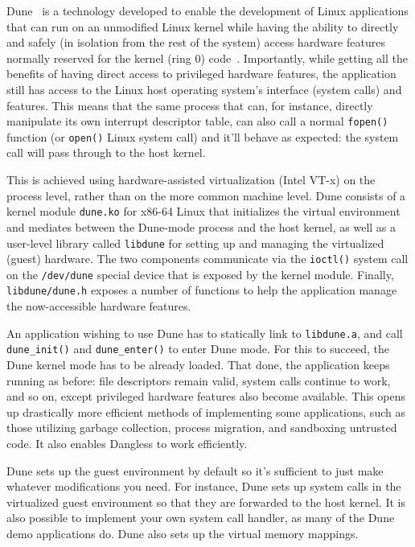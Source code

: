 Dune~\cite{dune-website} is a technology developed to enable the development of Linux applications that can run on an unmodified Linux kernel while having the ability to directly and safely (in isolation from the rest of the system) access hardware features normally reserved for the kernel (ring 0) code~\cite{dune-paper}. Importantly, while getting all the benefits of having direct access to privileged hardware features, the application still has access to the Linux host operating system's interface (system calls) and features. This means that the same process that can, for instance, directly manipulate its own interrupt descriptor table, can also call a normal \lstinline!fopen()! function (or \lstinline!open()! Linux system call) and it'll behave as expected: the system call will pass through to the host kernel.

This is achieved using hardware-assisted virtualization (Intel VT-x) on the process level, rather than on the more common machine level. Dune consists of a kernel module \texttt{dune.ko} for x86-64 Linux that initializes the virtual environment and mediates between the Dune-mode process and the host kernel, as well as a user-level library called \texttt{libdune} for setting up and managing the virtualized (guest) hardware. The two components communicate via the \lstinline!ioctl()! system call on the \texttt{/dev/dune} special device that is exposed by the kernel module. Finally, \texttt{libdune/dune.h} exposes a number of functions to help the application manage the now-accessible hardware features.

An application wishing to use Dune has to statically link to \texttt{libdune.a}, and call \lstinline!dune_init()! and \lstinline!dune_enter()! to enter Dune mode. For this to succeed, the Dune kernel mode has to be already loaded. That done, the application keeps running as before: file descriptors remain valid, system calls continue to work, and so on, except privileged hardware features also become available. This opens up drastically more efficient methods of implementing some applications, such as those utilizing garbage collection, process migration, and sandboxing untrusted code. It also enables Dangless to work efficiently.

Dune sets up the guest environment by default so it's sufficient to just make whatever modifications you need. For instance, Dune sets up system calls in the virtualized guest environment so that they are forwarded to the host kernel. It is also possible to implement your own system call handler, as many of the Dune demo applications do. Dune also sets up the virtual memory mappings. 

